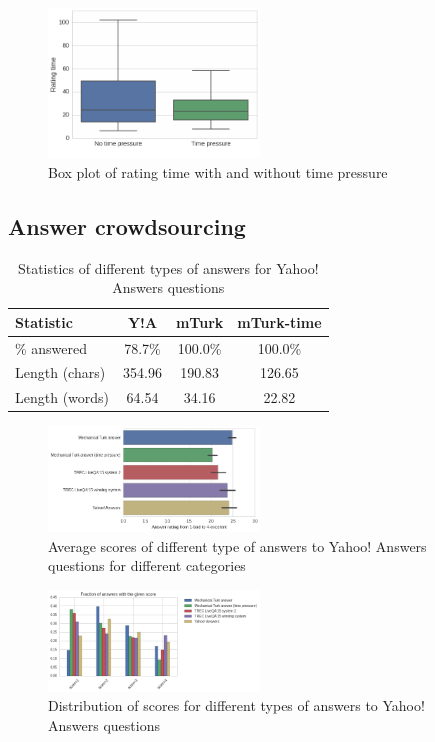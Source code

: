 \documentclass[11pt,letterpaper]{article}
\begin{document}
\begin{figure}[t!]
	\centering
	\includegraphics[width=0.5\textwidth]{img/validation_time}
	\caption{Box plot of rating time with and without time pressure}
	\label{figure:validation_time}
\end{figure}

\subsection{Answer crowdsourcing}

\begin{table}[h]
\centering
\caption{Statistics of different types of answers for Yahoo! Answers questions}
\begin{tabular}{| p{2.3cm} | c | c | c |}
\hline
Statistic & Y!A & mTurk & mTurk-time\\
\hline
\% answered & 78.7\% & 100.0\% & 100.0\% \\
Length (chars) & 354.96 & 190.83 & 126.65 \\
Length (words) & 64.54 & 34.16 & 22.82 \\
\hline
\end{tabular}
\label{table:answer_stats}
\end{table}

\begin{figure}[h]
\centering
\includegraphics[width=0.5\textwidth]{img/average_score}
\caption{Average scores of different type of answers to Yahoo! Answers questions for different categories}
\label{fig:average_score}
\end{figure}

\begin{figure}[h]
\centering
\includegraphics[width=0.5\textwidth]{img/scores_distribution}
\caption{Distribution of scores for different types of answers to Yahoo! Answers questions}
\label{fig:scores_distribution}
\end{figure}
\end{document}
